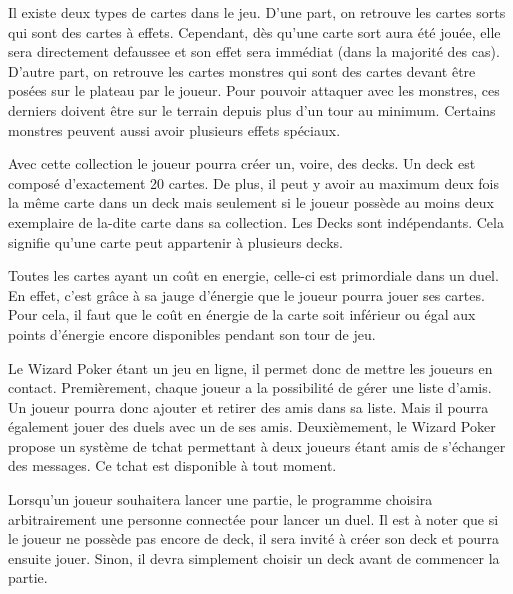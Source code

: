\documentclass[11pt,a4paper]{article}
\begin{document}
\medbreak
{}
Il existe deux types de \gls{carte}s dans le jeu. D'une part, on retrouve les cartes \gls{sort}s qui sont des cartes à effets. Cependant, dès qu'une carte \gls{sort} aura été jouée, elle sera directement \gls{defausse}e et son effet sera immédiat (dans la majorité des cas). D'autre part, on retrouve les cartes \gls{monstre}s qui sont des cartes devant être posées sur le plateau par le joueur. Pour pouvoir attaquer avec les monstres, ces derniers doivent être sur le terrain depuis plus d'un tour au minimum. Certains monstres peuvent aussi avoir plusieurs effets spéciaux.

\medbreak

Avec cette \gls{collection} le joueur pourra créer un, voire, des \gls{deck}s.  Un \gls{deck} est composé d'exactement 20 cartes.  De plus, il peut y avoir au maximum deux fois la même carte dans un \gls{deck} mais seulement si le joueur possède au moins deux exemplaire de la-dite carte dans sa \gls{collection}.  Les Decks sont indépendants.  Cela signifie qu'une carte peut appartenir à plusieurs decks.

\medbreak

Toutes les cartes ayant un coût en \gls{energie}, celle-ci est primordiale dans un duel. En effet, c'est grâce à sa jauge d'énergie que le joueur pourra jouer ses cartes. Pour cela, il faut que le coût en énergie de la carte soit inférieur ou égal aux points d'énergie encore disponibles pendant son tour de jeu.

\medbreak

Le Wizard Poker étant un jeu en ligne, il permet donc de mettre les joueurs en contact. Premièrement, chaque joueur a la possibilité de gérer une liste d'amis. Un joueur pourra donc ajouter et retirer des amis dans sa liste. Mais il pourra également jouer des duels avec un de ses amis. Deuxièmement, le Wizard Poker propose un système de \gls{tchat} permettant à deux joueurs étant amis de s'échanger des messages.  Ce tchat est disponible à tout moment. 

\medbreak

Lorsqu'un joueur souhaitera lancer une partie, le programme choisira arbitrairement une personne connectée pour lancer un duel. Il est à noter que si le joueur ne possède pas encore de deck, il sera invité à créer son deck et pourra ensuite jouer. Sinon, il devra simplement choisir un deck avant de commencer la partie.

\medbreak
\end{document}

